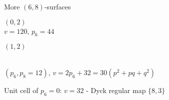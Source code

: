 \documentclass[%
pdf,
colorBG,
slideColor,
]{prosper}
\newcommand{\NN}{\ensuremath{\mathbb{N}}}
\newcommand{\ZZ}{\ensuremath{\mathbb{Z}}}
\begin{document}
\begin{slide}{More $(6,8)$-surfaces}
\begin{center}
\begin{minipage}[b]{5.5cm}
\centering
{}\par
$(0,2)$\\
$v=120$, $p_6=44$
\end{minipage}
\begin{minipage}[b]{5.5cm}
\centering
{}\par
$(1,2)$\\
\textcolor{white}{Bonjour}
\end{minipage}
\end{center}

\begin{center}
$(p_6, p_8=12)$, $v=2p_6+32=30(p^2+pq+q^2)$\par
Unit cell of $p_6=0$: $v=32$ - Dyck regular map $\{8,3\}$
\end{center}

\end{slide}


%
%
%

\end{document}

